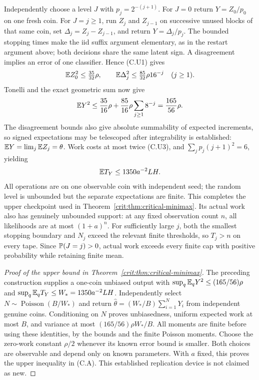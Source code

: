 Independently choose a level $J$ with $p_j=2^{-(j+1)}$. For $J=0$ return
$Y=Z_0/p_0$ on one fresh coin. For $J=j\ge1$, run $Z_j$ and $Z_{j-1}$
on successive unused blocks of that same coin, set $\Delta_j=Z_j-Z_{j-1}$,
and return $Y=\Delta_j/p_j$. The bounded stopping times make the iid suffix
argument elementary, as in the restart argument above; both decisions share
the same latent sign. A disagreement implies an error of one classifier.
Hence (C.U1) gives
\[
 \mathbb E Z_0^2\le\tfrac{35}{32}\rho,
 \qquad \mathbb E\Delta_j^2\le\tfrac{85}{32}\rho16^{-j}\quad(j\ge1).
\]
Tonelli and the exact geometric sum now give
\[
 \mathbb E Y^2\le\frac{35}{16}\rho+
                 \frac{85}{16}\rho\sum_{j\ge1}8^{-j}
            =\frac{165}{56}\rho.
\]
The disagreement bounds also give absolute summability of expected increments,
so signed expectations may be telescoped after integrability is established:
$\mathbb E Y=\lim_j\mathbb E Z_j=\theta$. Work costs at most twice (C.U3), and
$\sum_jp_j(j+1)^2=6$, yielding
\[
 \mathbb E T_Y\le1350a^{-2}LH.
\]
All operations are on one observable coin with independent seed; the random
level is unbounded but the separate expectations are finite. This completes
the upper checkpoint used in Theorem~\ref{crit:thm:critical-minimax}.
Its actual work also has genuinely unbounded support: at any fixed observation
count $n$, all likelihoods are at most $(1+a)^n$. For sufficiently large $j$,
both the smallest stopping boundary and $N_j$ exceed the relevant finite
thresholds, so $T_j>n$ on every tape. Since $\mathbb P(J=j)>0$, actual work exceeds
every finite cap with positive probability while retaining finite mean.



\begin{proof}[Proof of the upper bound in Theorem~\ref{crit:thm:critical-minimax}]
The preceding construction supplies a one-coin unbiased output with
$\sup_q\mathbb E_qY^2\le(165/56)\rho$ and
$\sup_q\mathbb E_qT_Y\le W_*=1350a^{-2}LH$. Independently select
$N\sim\operatorname{Poisson}(B/W_*)$ and return
$\widehat\theta=(W_*/B)\sum_{i=1}^NY_i$ from independent genuine coins.
Conditioning on $N$ proves unbiasedness, uniform expected work at most $B$,
and variance at most $(165/56)\rho W_*/B$. All moments are finite before
using these identities, by the bounds and the finite Poisson moments.
Choose the zero-work constant $\rho/2$ whenever its known error bound is
smaller. Both choices are observable and depend only on known parameters.
With $a$ fixed, this proves the upper inequality in (C.A). This established
replication device is not claimed as new.
\end{proof}
